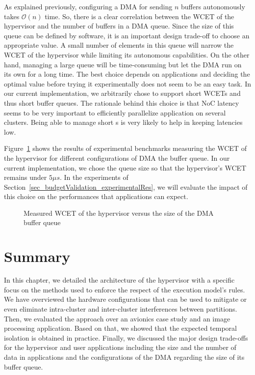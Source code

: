 \documentclass[main.tex]{subfiles}
\begin{document}
As explained previously, configuring a DMA for sending $n$ buffers autonomously takes $\mathcal{O}(n)$ time. So, there is a clear correlation between the WCET of the hypervisor and the number of buffers in a DMA queue. Since the size of this queue can be defined by software, it is an important design trade-off to choose an appropriate value. A small number of elements in this queue will narrow the WCET of the hypervisor while limiting its autonomous capabilities. On the other hand, managing a large queue will be time-consuming but let the DMA run on its own for a long time. The best choice depends on applications and deciding the optimal value before trying it experimentally does not seem to be an easy task. In our current implementation, we arbitrarily chose to support short WCETs and thus short buffer queues. The rationale behind this choice is that NoC latency seems to be very important to efficiently parallelize application on several clusters. Being able to manage short \PC{}s is very likely to help in keeping latencies low. 

Figure~\ref{fig_implemExecModel_WCETvsNbBufs} shows the results of experimental benchmarks measuring the WCET of the hypervisor for different configurations of DMA the buffer queue. In our current implementation, we chose the queue size so that the hypervisor's WCET remains under $5 \mu s$. In the experiments of Section~\ref{sec_budgetValidation_experimentalRes}, we will evaluate the impact of this choice on the performances that applications can expect.

\begin{figure}
    \centering
    \scalebox{1}{}
    \caption{Measured WCET of the hypervisor versus the size of the DMA buffer queue}
    \label{fig_implemExecModel_WCETvsNbBufs}
\end{figure}

\section{Summary}
In this chapter, we detailed the architecture of the hypervisor with a specific focus on the methods used to enforce the respect of the execution model's rules. We have overviewed the hardware configurations that can be used to mitigate or even eliminate intra-cluster and inter-cluster interferences between partitions. Then, we evaluated the approach over an avionics case study and an image processing application. Based on that, we showed that the expected temporal isolation is obtained in practice. Finally, we discussed the major design trade-offs for the hypervisor and user applications including the size and the number of data in applications and the configurations of the DMA regarding the size of its buffer queue. 
\end{document}
